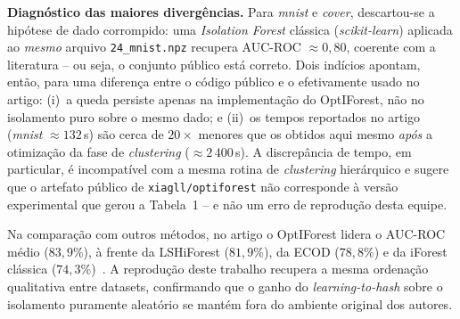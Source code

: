 \documentclass[conference]{IEEEtran}
\begin{document}
\textbf{Diagn\'ostico das maiores diverg\^encias.} Para \emph{mnist} e \emph{cover},
descartou-se a hip\'otese de dado corrompido: uma \emph{Isolation Forest} cl\'assica
(\emph{scikit-learn}) aplicada ao \emph{mesmo} arquivo \texttt{24\_mnist.npz} recupera
AUC-ROC $\approx 0{,}80$, coerente com a literatura -- ou seja, o conjunto p\'ublico
est\'a correto. Dois ind\'icios apontam, ent\~ao, para uma diferen\c{c}a entre o
c\'odigo p\'ublico e o efetivamente usado no artigo: (i)~a queda persiste apenas na
implementa\c{c}\~ao do OptIForest, n\~ao no isolamento puro sobre o mesmo dado; e
(ii)~os tempos reportados no artigo (\emph{mnist} $\approx 132$\,s) s\~ao cerca de
$20\times$ menores que os obtidos aqui mesmo \emph{ap\'os} a otimiza\c{c}\~ao da fase de
\emph{clustering} ($\approx 2\,400$\,s). A discrep\^ancia de tempo, em particular, \'e
incompat\'ivel com a mesma rotina de \emph{clustering} hier\'arquico e sugere que o
artefato p\'ublico de \texttt{xiagll/optiforest} n\~ao corresponde \`a vers\~ao
experimental que gerou a Tabela~1 -- e n\~ao um erro de reprodu\c{c}\~ao desta equipe.

Na compara\c{c}\~ao com outros m\'etodos, no artigo o OptIForest lidera o
AUC-ROC m\'edio ($83{,}9\%$), \`a frente da LSHiForest ($81{,}9\%$), da ECOD
($78{,}8\%$) e da iForest cl\'assica ($74{,}3\%$)~\cite{optiforest}. A reprodu\c{c}\~ao
deste trabalho recupera a mesma ordena\c{c}\~ao qualitativa entre datasets, confirmando
que o ganho do \emph{learning-to-hash} sobre o isolamento puramente aleat\'orio se
mant\'em fora do ambiente original dos autores.
\end{document}
